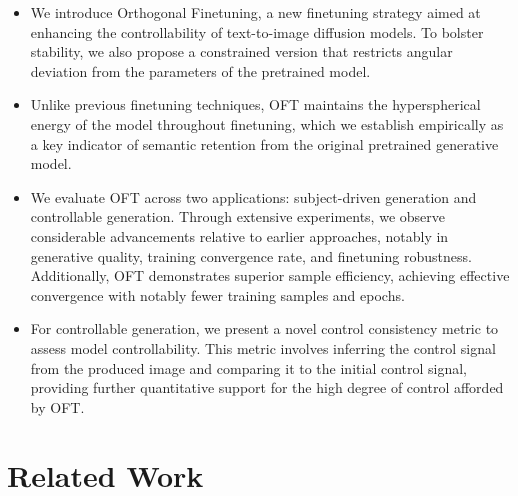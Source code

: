 \begin{itemize}[leftmargin=*,nosep]

    \item We introduce Orthogonal Finetuning, a new finetuning strategy aimed at enhancing the controllability of text-to-image diffusion models. To bolster stability, we also propose a constrained version that restricts angular deviation from the parameters of the pretrained model.
    \item Unlike previous finetuning techniques, OFT maintains the hyperspherical energy of the model throughout finetuning, which we establish empirically as a key indicator of semantic retention from the original pretrained generative model.
    \item We evaluate OFT across two applications: subject-driven generation and controllable generation. Through extensive experiments, we observe considerable advancements relative to earlier approaches, notably in generative quality, training convergence rate, and finetuning robustness. Additionally, OFT demonstrates superior sample efficiency, achieving effective convergence with notably fewer training samples and epochs.
    \item For controllable generation, we present a novel control consistency metric to assess model controllability. This metric involves inferring the control signal from the produced image and comparing it to the initial control signal, providing further quantitative support for the high degree of control afforded by OFT.
\end{itemize}

\section{Related Work}

